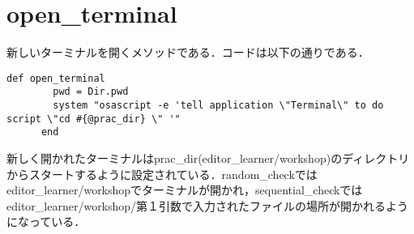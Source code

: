     \section{open\_terminal}\label{open_terminal}

新しいターミナルを開くメソッドである．コードは以下の通りである．

\begin{verbatim}
def open_terminal
        pwd = Dir.pwd
        system "osascript -e 'tell application \"Terminal\" to do script \"cd #{@prac_dir} \" '"
      end
\end{verbatim}

新しく開かれたターミナルはprac\_dir(editor\_learner/workshop)のディレクトリからスタートするように設定されている．random\_checkではeditor\_learner/workshopでターミナルが開かれ，sequential\_checkではeditor\_learner/workshop/第１引数で入力されたファイルの場所が開かれるようになっている．

    